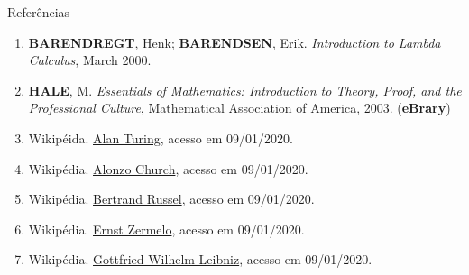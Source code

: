 \begin{frame}[fragile]{Referências}

    \begin{enumerate}
        \item \textbf{BARENDREGT}, Henk; \textbf{BARENDSEN}, Erik. \textit{Introduction to 
            Lambda Calculus}, March 2000.

        \item \textbf{HALE}, M. \textit{Essentials of Mathematics: Introduction to Theory, Proof, and the Professional Culture}, Mathematical Association of America, 2003. (\textbf{eBrary})
        
        \item Wikipéida. \href{https://en.wikipedia.org/wiki/Alan_Turing}{Alan Turing},
            acesso em 09/01/2020.
 
        \item Wikipédia. \href{https://en.wikipedia.org/wiki/Alonzo_Church}{Alonzo Church},
            acesso em 09/01/2020.
             
        \item Wikipédia. \href{https://en.wikipedia.org/wiki/Bertrand_Russell}{Bertrand Russel},
            acesso em 09/01/2020.

        \item Wikipédia. \href{https://en.wikipedia.org/wiki/Ernst_Zermelo}{Ernst Zermelo},
            acesso em 09/01/2020.
 
        \item Wikipédia. \href{https://en.wikipedia.org/wiki/Gottfried_Wilhelm_Leibniz}{Gottfried Wilhelm Leibniz}, acesso em 09/01/2020.
 
    \end{enumerate}

\end{frame}
